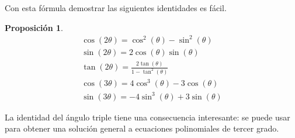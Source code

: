 \documentclass{article}
\newtheorem{prop}{Proposición}
\begin{document}
Con esta fórmula demostrar las siguientes identidades es fácil.

\begin{prop}
	\begin{eqnarray*}
		\cos(2\theta) = \cos^2(\theta) - \sin^2(\theta) \\ 
		\sin(2\theta) = 2\cos(\theta)\sin(\theta) \\ 
		\tan(2\theta) = \frac{2\tan(\theta)}{1 - \tan^2(\theta)} \\ 
		\cos(3\theta) = 4\cos^3(\theta) - 3\cos(\theta) \\ 
		\sin(3\theta) = -4\sin^3(\theta) + 3\sin(\theta)
	\end{eqnarray*}
\end{prop}

La identidad del ángulo triple tiene una consecuencia interesante: se puede usar para obtener una solución general a ecuaciones polinomiales de tercer grado.
\end{document}
